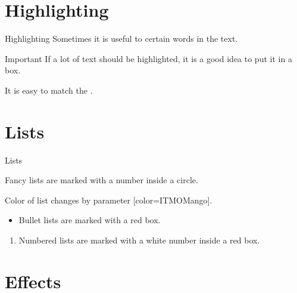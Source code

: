 \documentclass[11pt, aspectratio=169]{beamer}
\begin{document}
\section{Highlighting}


\begin{frame}{Highlighting}
    Sometimes it is useful to  certain words in the text.

    \begin{alertblock}{Important}
        If a lot of text should be \alert{highlighted}, it is a good idea to put it in a box.
    \end{alertblock}


    It is easy to match the .
\end{frame}


\section{Lists}


\begin{frame}{Lists}
    \begin{fancylist}
        \item Fancy lists are marked with a number inside a circle.
    \end{fancylist}

    \begin{fancylist}[color=ITMOMango]
        \item Color of list changes by parameter [color=ITMOMango].
    \end{fancylist}

    \begin{itemize}
        \item
        Bullet lists are marked with a red box.
    \end{itemize}

    \begin{enumerate}
        \item
        Numbered lists are marked with a white number inside a red box.
    \end{enumerate}
\end{frame}


\section{Effects}
\end{document}
